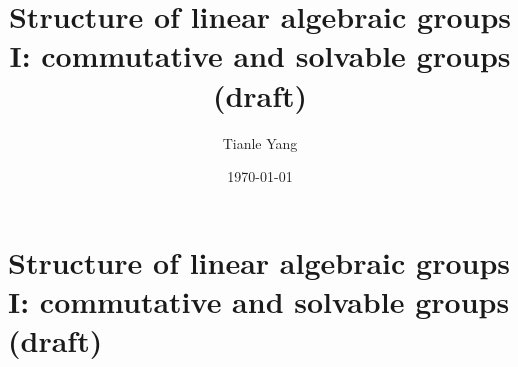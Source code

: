 \documentclass{noteformyself}
\title{Structure of linear algebraic groups I: commutative and solvable groups (draft)}
\author{Tianle Yang}
\date{\today}
\begin{document}
    \maketitle

    \section{Structure of linear algebraic groups I: commutative and solvable groups (draft)}



\end{document}
